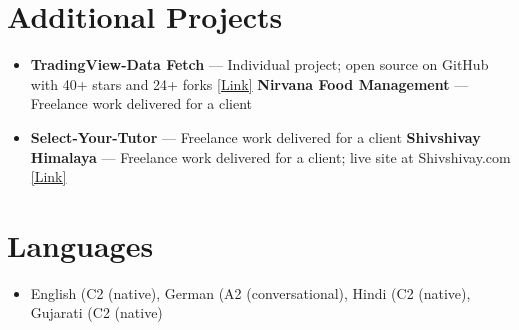 \documentclass[a4paper,10pt]{article}
\begin{document}
\section*{Additional Projects}
\begin{itemize}
\item \textbf{TradingView-Data Fetch} — Individual project; open source on GitHub with 40+ stars and 24+ forks \href{https://github.com/ravalmeet/TradingView}{[Link]} \hfill \textbf{Nirvana Food Management} — Freelance work delivered for a client
\item \textbf{Select-Your-Tutor} — Freelance work delivered for a client \hfill \textbf{Shivshivay Himalaya} — Freelance work delivered for a client; live site at Shivshivay.com \href{Shivshivay.com}{[Link]}
\end{itemize}

\section*{Languages}
\begin{itemize}
\item English (C2 (native), German (A2 (conversational), Hindi (C2 (native), Gujarati (C2 (native)
\end{itemize}
\end{document}

